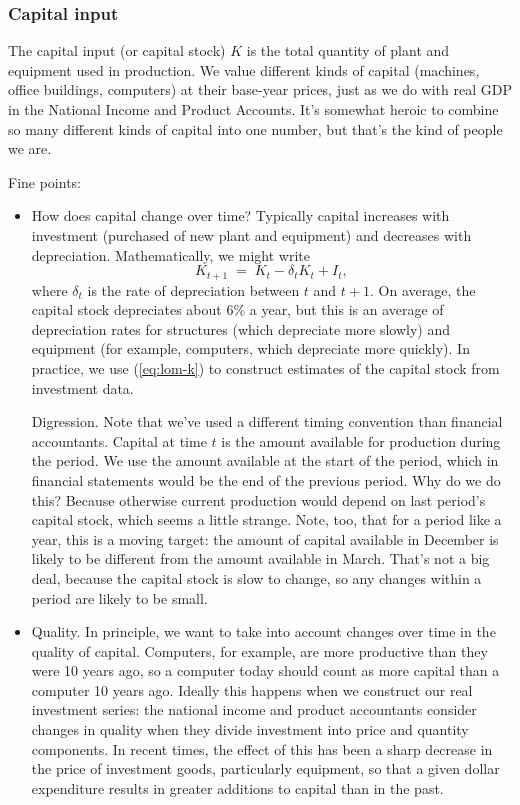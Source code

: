\documentclass[letterpaper,12pt]{article}
\begin{document}
\subsubsection*{Capital input}

The capital input (or capital stock) $K$
is the total quantity of plant and equipment used in production.
We value different kinds of capital (machines, office buildings, computers)
at their base-year prices, just as we do with real GDP in the National Income and Product Accounts.
It's somewhat heroic to combine so many different kinds of capital into one
number, but that's the kind of people we are.

Fine points:
\begin{itemize}
\item How does capital change over time?
Typically capital increases with investment (purchased of new plant and equipment)
and decreases with depreciation.
Mathematically, we might write
\begin{equation}
    K_{t+1} \;=\; K_{t} - \delta_t K_{t} + I_{t} ,
    \label{eq:lom-k}
\end{equation}
where $\delta_t$ is the rate of depreciation between $t$ and $t+1$.
On average, the capital stock depreciates about 6\% a year,
but this is an average of depreciation rates for structures
(which depreciate more slowly) and equipment
(for example, computers, which depreciate more quickly).
In practice, we use (\ref{eq:lom-k}) to construct
estimates of the capital stock from investment data.

Digression.
{\footnotesize
 Note that we've used a different timing convention
than financial accountants.
Capital at time $t$ is the amount available for production
during the period.
We use the amount available at the start of the period,
which in financial statements would be the end of the previous
period.
Why do we do this?  Because otherwise
current production would depend on last period's
capital stock, which seems a little strange.
Note, too, that for a period like a year, this is a moving target:
the amount of capital available in December is likely to
be different from the amount available in March.
That's not a big deal, because the capital stock is slow to change,
so any changes within a period are likely to be small.}

\item Quality.
In principle, we want to take into account changes over time
in the quality of capital.
Computers, for example, are more productive than they were
10 years ago, so a computer today should count as more capital
than a computer 10 years ago.
Ideally this happens when we construct our real investment series:
the national income and product accountants consider changes
in quality when they divide investment into price and quantity components.
In recent times, the effect of this has been a sharp decrease
in the price of investment goods,
particularly equipment,
so that a given dollar expenditure
results in greater additions to capital than in the past.



\end{itemize}
\end{document}
